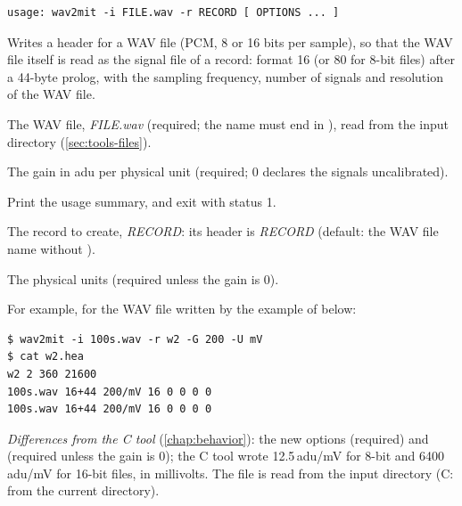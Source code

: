 \begin{lstlisting}[style=signature,language={}]
usage: wav2mit -i FILE.wav -r RECORD [ OPTIONS ... ]
\end{lstlisting}
Writes a header for a WAV file (PCM, 8 or 16 bits per sample), so that the WAV file itself
is read as the signal file of a record: format 16 (or 80 for 8-bit files) after a 44-byte
prolog, with the sampling frequency, number of signals and resolution of the WAV file.
\begin{params}
\item[-i] The WAV file, \textit{FILE.wav} (required; the name must end in ),
  read from the input directory (\cref{sec:tools-files}).
\item[-G] The gain in adu per physical unit (required; 0 declares the signals
  uncalibrated).
\item[-h] Print the usage summary, and exit with status 1.
\item[-r] The record to create, \textit{RECORD}: its header is \textit{RECORD}
  (default: the WAV file name without ).
\item[-U] The physical units (required unless the gain is 0).
\end{params}
For example, for the WAV file written by the example of  below:
\begin{lstlisting}[style=text]
$ wav2mit -i 100s.wav -r w2 -G 200 -U mV
$ cat w2.hea
w2 2 360 21600
100s.wav 16+44 200/mV 16 0 0 0 0
100s.wav 16+44 200/mV 16 0 0 0 0
\end{lstlisting}
\textit{Differences from the C tool} (\cref{chap:behavior}): the new options 
(required) and  (required unless the gain is 0); the C tool wrote 12.5\,adu/mV for
8-bit and 6400\,adu/mV for 16-bit files, in millivolts. The  file is read from the
input directory (C: from the current directory).

